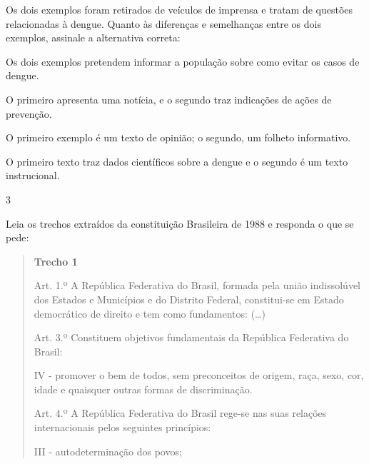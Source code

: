 Os dois exemplos foram retirados de veículos de imprensa e tratam de
questões relacionadas à dengue. Quanto às diferenças e semelhanças entre
os dois exemplos, assinale a alternativa correta:

\begin{escolha}

    \item Os dois exemplos pretendem informar a população sobre como evitar os casos de dengue.

    \item O primeiro apresenta uma notícia, e o segundo traz indicações de ações de prevenção.

    \item O primeiro exemplo é um texto de opinião; o segundo, um folheto informativo.

    \item O primeiro texto traz dados científicos sobre a dengue e o segundo é um texto instrucional.

\end{escolha}

\num{3}

Leia os trechos extraídos da constituição Brasileira de 1988 e responda
o que se pede:

\begin{quote}

\textbf{Trecho 1}

Art. 1.º A República Federativa do Brasil, formada pela união
indissolúvel dos Estados e Municípios e do Distrito Federal,
constitui-se em Estado democrático de direito e tem como fundamentos: (\ldots{})

Art. 3.º Constituem objetivos fundamentais da República Federativa do
Brasil:

IV - promover o bem de todos, sem preconceitos de origem, raça, sexo,
cor, idade e quaisquer outras formas de discriminação.

Art. 4.º A República Federativa do Brasil rege-se nas suas relações
internacionais pelos seguintes princípios:

III - autodeterminação dos povos;

\end{quote}


